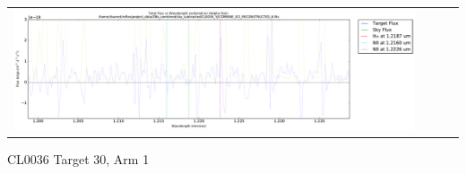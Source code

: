 \documentclass[10pt,letterpaper]{article}
\begin{document}
\begin{table}[h!]
\begin{center}
\begin{tabular}{ >{\centering\arraybackslash}m{2.5in} >{\centering\arraybackslash}m{2.5in} >{\centering\arraybackslash}m{2.5in} >{\centering\arraybackslash}m{2.3in}}
\includegraphics[scale=0.45]{../figures/CL0036_YJ/COMBINE_SCI_RECONSTRUCTED_8_Halpha.pdf}
\end{tabular}
\end{center}
\end{table}

\newpage

CL0036 Target 30, Arm 1 \\
\end{document}
